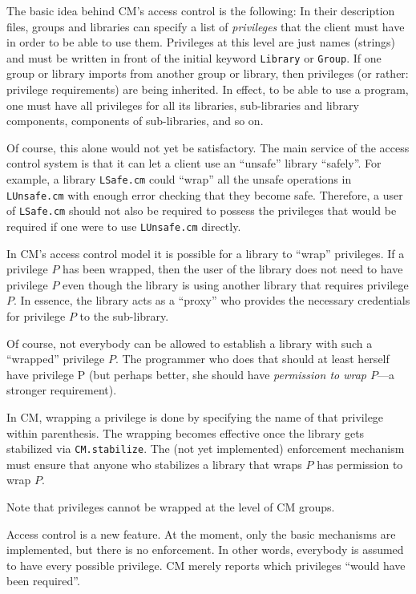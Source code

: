 \documentclass[titlepage,letterpaper]{article}
\begin{document}
The basic idea behind CM's access control is the following: In their
description files, groups and libraries can specify a list of
{\em privileges} that the client must have in order to be able to use them.
Privileges at this level are just names (strings) and must be written
in front of the initial keyword {\tt Library} or {\tt Group}.  If one
group or library imports from another group or library, then
privileges (or rather: privilege requirements) are being inherited.
In effect, to be able to use a program, one must have all privileges
for all its libraries, sub-libraries and library components,
components of sub-libraries, and so on.

Of course, this alone would not yet be satisfactory.  The main service
of the access control system is that it can let a client use an
``unsafe'' library ``safely''.  For example, a library {\tt LSafe.cm}
could ``wrap'' all the unsafe operations in {\tt LUnsafe.cm} with
enough error checking that they become safe.  Therefore, a user of
{\tt LSafe.cm} should not also be required to possess the privileges
that would be required if one were to use {\tt LUnsafe.cm} directly.

In CM's access control model it is possible for a library to ``wrap''
privileges.  If a privilege $P$ has been wrapped, then the user of the
library does not need to have privilege $P$ even though the library is
using another library that requires privilege $P$.  In essence, the
library acts as a ``proxy'' who provides the necessary credentials for
privilege $P$ to the sub-library.

Of course, not everybody can be allowed to establish a library with
such a ``wrapped'' privilege $P$.  The programmer who does that should at
least herself have privilege P (but perhaps better, she should have
{\em permission to wrap $P$}---a stronger requirement).

In CM, wrapping a privilege is done by specifying the name of that
privilege within parenthesis.  The wrapping becomes effective once the
library gets stabilized via {\tt CM.stabilize}.  The (not yet
implemented) enforcement mechanism must ensure that anyone who
stabilizes a library that wraps $P$ has permission to wrap $P$.

Note that privileges cannot be wrapped at the level of CM groups.

Access control is a new feature. At the moment, only the basic
mechanisms are implemented, but there is no enforcement.  In other
words, everybody is assumed to have every possible privilege.  CM
merely reports which privileges ``would have been required''.
\end{document}
